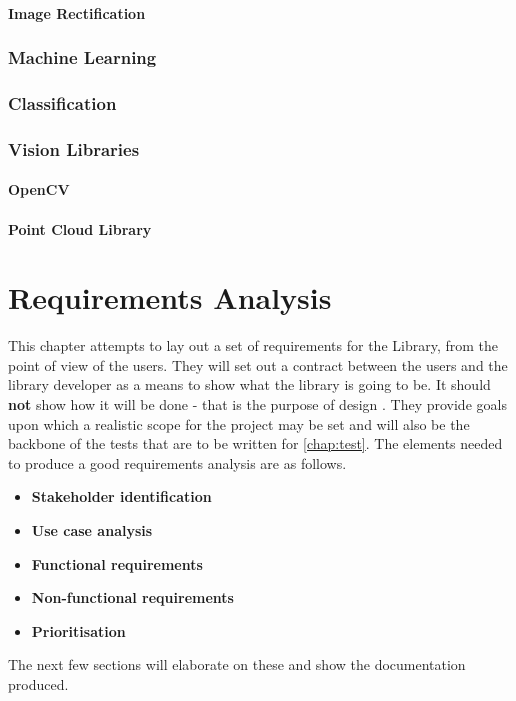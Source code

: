 \documentclass[11pt,oneside]{report}
\begin{document}
				\subsubsection{Image Rectification}
				
				
				
			\subsection{Machine Learning}%
			\subsection{Classification}
			\subsection{Vision Libraries}
				\subsubsection{OpenCV}
				\subsubsection{Point Cloud Library}
				
	\chapter{Requirements Analysis}\label{chap:req}
	This chapter attempts to lay out a set of requirements for the Library, from the point of view of the users.
	They will set out a contract between the users and the library developer as a means to show what the library is going to be. It should \textbf{not} show how it will be done - that is the purpose of design \cite{book:dawson}.
	They provide goals upon which a realistic scope for the project may be set and will also be the backbone of the tests that are to be written for \autoref{chap:test}.
	The elements needed to produce a good requirements analysis are as follows.
	\begin{itemize}
		\item \textbf{Stakeholder identification}
		\item \textbf{Use case analysis}
		\item \textbf{Functional requirements}
		\item \textbf{Non-functional requirements}
		\item \textbf{Prioritisation}
	\end{itemize}
	The next few sections will elaborate on these and show the documentation produced. 
\end{document}
